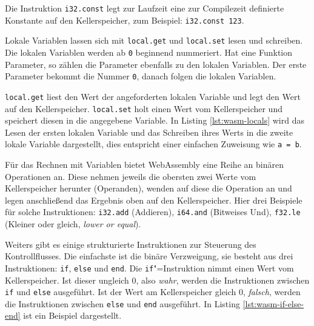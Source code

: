 Die Instruktion \lstinline{i32.const} legt zur Laufzeit eine zur Compilezeit definierte Konstante auf den Kellerspeicher, zum Beispiel: \lstinline{i32.const 123}.

Lokale Variablen lassen sich mit \lstinline{local.get} und \lstinline{local.set} lesen und schreiben. Die lokalen Variablen werden ab \lstinline{0} beginnend nummeriert. Hat eine Funktion Parameter, so zählen die Parameter ebenfalls zu den lokalen Variablen. Der erste Parameter bekommt die Nummer \lstinline{0}, danach folgen die lokalen Variablen.

\lstinline{local.get} liest den Wert der angeforderten lokalen Variable und legt den Wert auf den Kellerspeicher. \lstinline{local.set} holt einen Wert vom Kellerspeicher und speichert diesen in die angegebene Variable. In Listing \ref{lst:wasm-locals} wird das Lesen der ersten lokalen Variable und das Schreiben ihres Werts in die zweite lokale Variable dargestellt, dies entspricht einer einfachen Zuweisung wie \lstinline{a = b}. 



Für das Rechnen mit Variablen bietet WebAssembly eine Reihe an binären Operationen an. Diese nehmen jeweils die obersten zwei Werte vom Kellerspeicher herunter (Operanden), wenden auf diese die Operation an und legen anschließend das Ergebnis oben auf den Kellerspeicher. Hier drei Beispiele für solche Instruktionen: \lstinline{i32.add} (Addieren), \lstinline{i64.and} (Bitweises Und), \lstinline{f32.le} (Kleiner oder gleich, \emph{lower or equal}).

Weiters gibt es einige strukturierte Instruktionen zur Steuerung des Kontrollflusses. Die einfachste ist die binäre Verzweigung, sie besteht aus drei Instruktionen: \lstinline{if}, \lstinline{else} und \lstinline{end}. Die \lstinline{if}"=Instruktion nimmt einen Wert vom Kellerspeicher. Ist dieser ungleich 0, also \emph{wahr}, werden die Instruktionen zwischen \lstinline{if} und \lstinline{else} ausgeführt. Ist der Wert am Kellerspeicher gleich 0, \emph{falsch}, werden die Instruktionen zwischen \lstinline{else} und \lstinline{end} ausgeführt. In Listing \ref{lst:wasm-if-else-end} ist ein Beispiel dargestellt.



